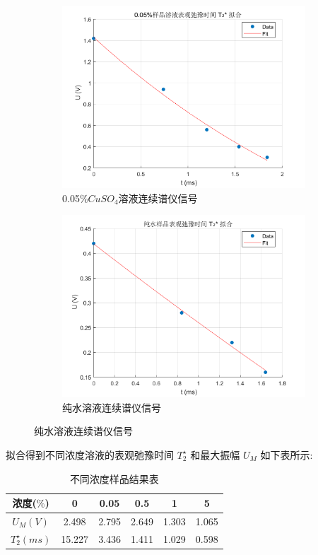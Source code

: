 \documentclass[12pt,a4paper]{article}
\begin{document}
\begin{figure}[ht]
\begin{subfigure}[b]{0.45\textwidth}
    \includegraphics[width=\textwidth]{005弛豫时间拟合.png}
    \caption{0.05\%$CuSO_4$溶液连续谱仪信号}
\end{subfigure}
\hfill
\begin{subfigure}[b]{0.45\textwidth}
    \includegraphics[width=\textwidth]{纯水弛豫时间拟合.png}
    \caption{纯水溶液连续谱仪信号}
\end{subfigure}
\end{figure}


拟合得到不同浓度溶液的表观弛豫时间 $T_2^{\star}$ 和最大振幅 $U_M$ 如下表所示:
\begin{table}[H]
    \centering
    \begin{tabular}{|c|c|c|c|c|c|}
    \hline
    浓度($\%$) & 0      & 0.05  & 0.5   & 1     & 5     \\ \hline
    $U_M(V)$     & 2.498  & 2.795 & 2.649 & 1.303 & 1.065 \\ \hline
   $T_2^{\star}(ms)$          & 15.227 & 3.436 & 1.411 & 1.029 & 0.598 \\ \hline
    \end{tabular}
    \caption{不同浓度样品结果表}
    \end{table}
\end{document}
